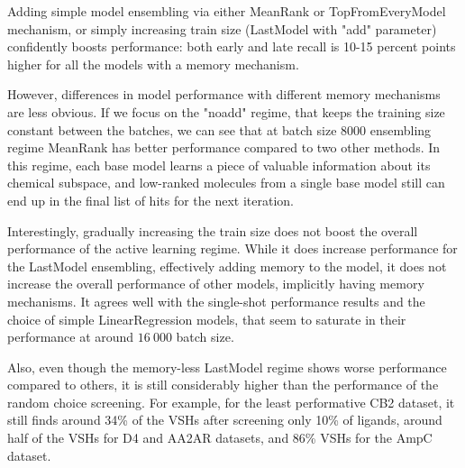 Adding simple model ensembling via either MeanRank or TopFromEveryModel mechanism, or simply increasing train size (LastModel with "add" parameter) confidently boosts performance: both early and late recall is 10-15 percent points higher for all the models with a memory mechanism.

However, differences in model performance with different memory mechanisms are less obvious. If we focus on the "noadd" regime, that keeps the training size constant between the batches, we can see that at batch size 8000  ensembling regime MeanRank has better performance compared to two other methods. In this regime, each base model learns a piece of valuable information about its chemical subspace, and low-ranked molecules from a single base model still can end up in the final list of hits for the next iteration.

Interestingly, gradually increasing the train size does not boost the overall performance of the active learning regime. While it does increase performance for the LastModel ensembling, effectively adding memory to the model, it does not increase the overall performance of other models, implicitly having memory mechanisms. It agrees well with the single-shot performance results and the choice of simple LinearRegression models, that seem to saturate in their performance at around $16\ 000$ batch size.

Also, even though the memory-less LastModel regime shows worse performance compared to others, it is still considerably higher than the performance of the random choice screening. For example, for the least performative CB2 dataset, it still finds around 34\% of the VSHs after screening only 10\% of ligands, around half of the VSHs for D4 and AA2AR datasets, and 86\% VSHs for the AmpC dataset.
